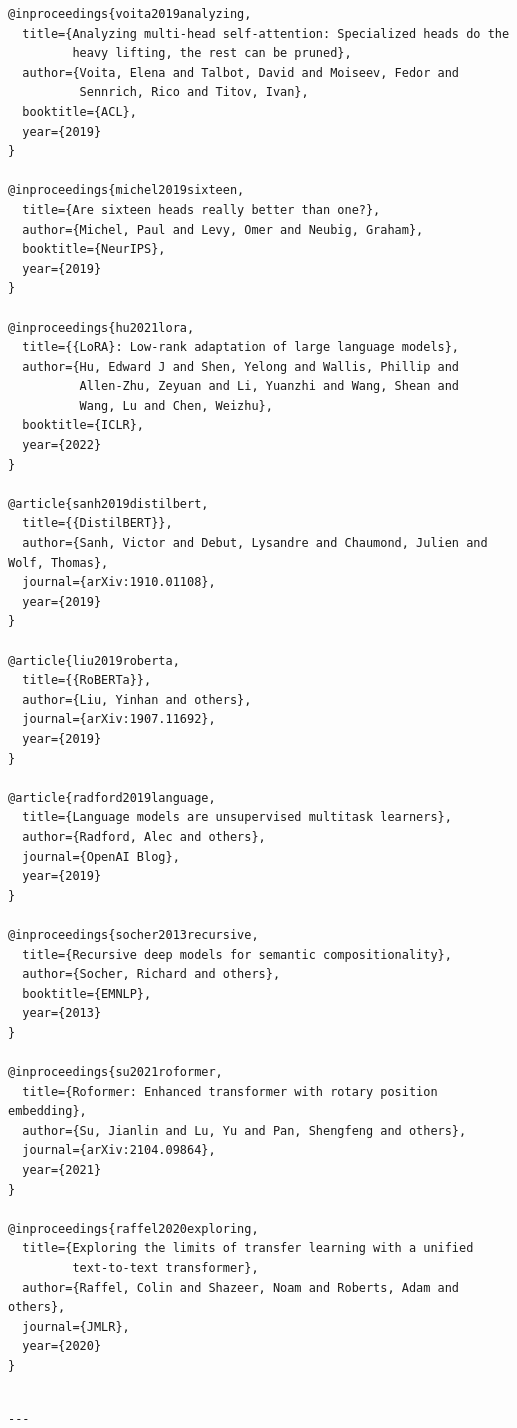 \begin{lstlisting}
@inproceedings{voita2019analyzing,
  title={Analyzing multi-head self-attention: Specialized heads do the 
         heavy lifting, the rest can be pruned},
  author={Voita, Elena and Talbot, David and Moiseev, Fedor and 
          Sennrich, Rico and Titov, Ivan},
  booktitle={ACL},
  year={2019}
}

@inproceedings{michel2019sixteen,
  title={Are sixteen heads really better than one?},
  author={Michel, Paul and Levy, Omer and Neubig, Graham},
  booktitle={NeurIPS},
  year={2019}
}

@inproceedings{hu2021lora,
  title={{LoRA}: Low-rank adaptation of large language models},
  author={Hu, Edward J and Shen, Yelong and Wallis, Phillip and 
          Allen-Zhu, Zeyuan and Li, Yuanzhi and Wang, Shean and 
          Wang, Lu and Chen, Weizhu},
  booktitle={ICLR},
  year={2022}
}

@article{sanh2019distilbert,
  title={{DistilBERT}},
  author={Sanh, Victor and Debut, Lysandre and Chaumond, Julien and Wolf, Thomas},
  journal={arXiv:1910.01108},
  year={2019}
}

@article{liu2019roberta,
  title={{RoBERTa}},
  author={Liu, Yinhan and others},
  journal={arXiv:1907.11692},
  year={2019}
}

@article{radford2019language,
  title={Language models are unsupervised multitask learners},
  author={Radford, Alec and others},
  journal={OpenAI Blog},
  year={2019}
}

@inproceedings{socher2013recursive,
  title={Recursive deep models for semantic compositionality},
  author={Socher, Richard and others},
  booktitle={EMNLP},
  year={2013}
}

@inproceedings{su2021roformer,
  title={Roformer: Enhanced transformer with rotary position embedding},
  author={Su, Jianlin and Lu, Yu and Pan, Shengfeng and others},
  journal={arXiv:2104.09864},
  year={2021}
}

@inproceedings{raffel2020exploring,
  title={Exploring the limits of transfer learning with a unified 
         text-to-text transformer},
  author={Raffel, Colin and Shazeer, Noam and Roberts, Adam and others},
  journal={JMLR},
  year={2020}
}
\end{lstlisting}
\begin{lstlisting}

---
\end{lstlisting}